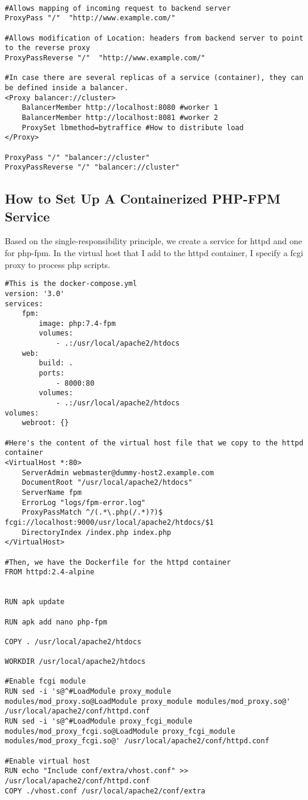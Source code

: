 \documentclass{article}
\begin{document}
\begin{verbatim}

#Allows mapping of incoming request to backend server 
ProxyPass "/"  "http://www.example.com/"

#Allows modification of Location: headers from backend server to point to the reverse proxy
ProxyPassReverse "/"  "http://www.example.com/"

#In case there are several replicas of a service (container), they can be defined inside a balancer. 
<Proxy balancer://cluster>
	BalancerMember http://localhost:8080 #worker 1
	BalancerMember http://localhost:8081 #worker 2
	ProxySet lbmethod=bytraffice #How to distribute load
</Proxy>

ProxyPass "/" "balancer://cluster"
ProxyPassReverse "/" "balancer://cluster"

\end{verbatim}

\subsection{How to Set Up A Containerized PHP-FPM Service}
Based on the single-responsibility principle, we create a service for httpd and one for php-fpm. In the virtual host that I add to the httpd container, I specify a fcgi proxy to process php scripts. 
\begin{verbatim}
#This is the docker-compose.yml
version: '3.0'
services: 
    fpm:
        image: php:7.4-fpm
        volumes: 
            - .:/usr/local/apache2/htdocs
    web:
        build: .
        ports:
            - 8000:80
        volumes:
            - .:/usr/local/apache2/htdocs
volumes:
    webroot: {}

#Here's the content of the virtual host file that we copy to the httpd container
<VirtualHost *:80>
    ServerAdmin webmaster@dummy-host2.example.com
    DocumentRoot "/usr/local/apache2/htdocs"
    ServerName fpm
    ErrorLog "logs/fpm-error.log"
    ProxyPassMatch ^/(.*\.php(/.*)?)$ fcgi://localhost:9000/usr/local/apache2/htdocs/$1
    DirectoryIndex /index.php index.php
</VirtualHost>
        
#Then, we have the Dockerfile for the httpd container
FROM httpd:2.4-alpine


RUN apk update 

RUN apk add nano php-fpm

COPY . /usr/local/apache2/htdocs

WORKDIR /usr/local/apache2/htdocs

#Enable fcgi module
RUN sed -i 's@^#LoadModule proxy_module modules/mod_proxy.so@LoadModule proxy_module modules/mod_proxy.so@' /usr/local/apache2/conf/httpd.conf
RUN sed -i 's@^#LoadModule proxy_fcgi_module modules/mod_proxy_fcgi.so@LoadModule proxy_fcgi_module modules/mod_proxy_fcgi.so@' /usr/local/apache2/conf/httpd.conf

#Enable virtual host
RUN echo "Include conf/extra/vhost.conf" >> /usr/local/apache2/conf/httpd.conf
COPY ./vhost.conf /usr/local/apache2/conf/extra



\end{verbatim}
\end{document}

